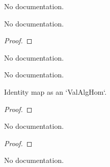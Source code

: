 \begin{definition}\label{ValAlgHom.ofAlgHomClassValRingHomClass}
        \leanok
                No documentation.
    \end{definition}

\begin{theorem}\label{comp_valAlgebraMap}
        \leanok
                No documentation.
    \end{theorem}

\begin{proof}
    \leanok
\end{proof}

\begin{definition}\label{ValAlgEquiv.mk'}
                No documentation.
    \end{definition}

\begin{theorem}\label{ValAlgEquiv.coe_mk'}
                No documentation.
    \end{theorem}

\begin{theorem}\label{ValAlgHom.coe_id}
        \leanok
                Identity map as an `ValAlgHom`.
    \end{theorem}

\begin{proof}
    \leanok
\end{proof}

\begin{theorem}\label{ValAlgHom.id_toValRingHom}
        \leanok
                No documentation.
    \end{theorem}

\begin{proof}
    \leanok
\end{proof}

\begin{theorem}\label{ValAlgHom.coe_comp}
        \leanok
                No documentation.
    \end{theorem}


